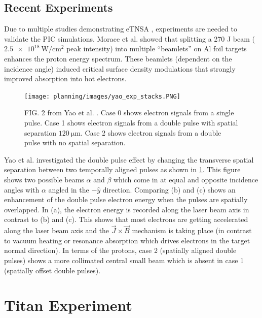 
\subsection{Recent Experiments}

Due to multiple studies demonstrating \gls{eTNSA} \cite{Ferri_2019_Nat_Comm,Rahman_2021_PoP,Khan_2024_NJoP}, experiments are needed to validate the \gls{PIC} simulations. Morace et al. \cite{Morace_2019_Nat_Comm} showed that splitting a 270 J beam ($\SI{2.5e18}{\watt \per \centi \meter \squared}$ peak intensity) into multiple ``beamlets'' on Al foil targets enhances the proton energy spectrum. These beamlets (dependent on the incidence angle) induced critical surface density modulations that strongly improved absorption into hot electrons. 

\begin{figure}
	\centering 
	\texttt{[image: planning/images/yao\_exp\_stacks.PNG]}
	\caption{FIG. 2 from Yao et al. \cite{Yao_2024_MaRaE}. Case 0 shows electron signals from a single pulse. Case 1 shows electron signals from a double pulse with spatial separation $\SI{120}{\micro \meter}$. Case 2 shows electron signals from a double pulse with no spatial separation.}
	\label{fig:yao_exp_stacks}
\end{figure}

Yao et al. \cite{Yao_2024_MaRaE} investigated the double pulse effect by changing the transverse spatial separation between two temporally aligned pulses as shown in \cref{fig:yao_exp_stacks}. This figure shows two possible beams $\alpha$ and $\beta$ which come in at equal and opposite incidence angles with $\alpha$ angled in the $-\hat{y}$ direction. Comparing (b) and (c) shows an enhancement of the double pulse electron energy when the pulses are spatially overlapped. In (a), the electron energy is recorded along the laser beam axis in contrast to (b) and (c). This shows that most electrons are getting accelerated along the laser beam axis and the $\vec{J} \times \vec{B}$ mechanism is taking place (in contrast to vacuum heating or resonance absorption which drives electrons in the  target normal direction). In terms of the protons, case 2 (spatially aligned double pulses) shows a more collimated central small beam which is absent in case 1 (spatially offset double pulses).

\section{Titan Experiment}


